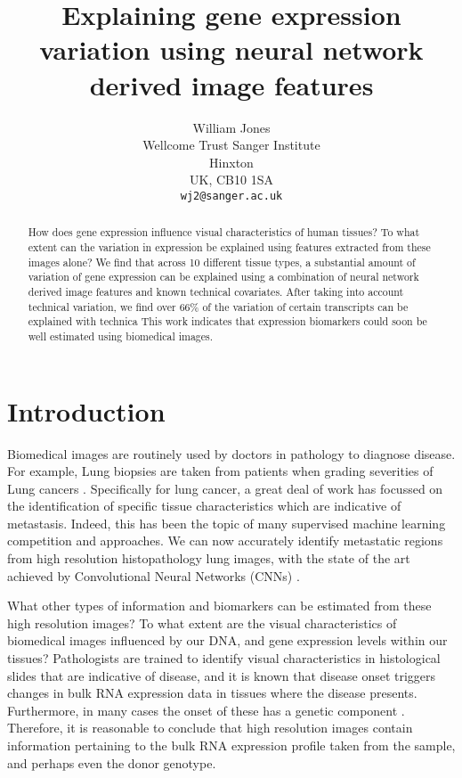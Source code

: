 \documentclass{article}
\title{Explaining gene expression variation using neural network derived image features}
\author{
  William Jones\\
  Wellcome Trust Sanger Institute\\
  Hinxton\\
  UK, CB10 1SA \\
  \texttt{wj2@sanger.ac.uk} \\
}
\begin{document}

\maketitle

\begin{abstract}
How does gene expression influence visual characteristics of human tissues? To what extent can the variation in expression be explained using features extracted from these images alone? We find that across 10 different tissue types, a substantial amount of variation of gene expression can be explained using a combination of neural network derived image features and known technical covariates. After taking into account technical variation, we find over 66\% of the variation of certain transcripts can be explained with technica This work indicates that expression biomarkers could soon be well estimated using biomedical images. \end{abstract}

\section{Introduction}
Biomedical images are routinely used by doctors in pathology to diagnose disease. For example, Lung biopsies are taken from patients when grading severities of Lung cancers \cite{histology-classification-lung-cancer}. Specifically for lung cancer, a great deal of work has focussed on the identification of specific tissue characteristics which are indicative of metastasis. Indeed, this has been the topic of many supervised machine learning competition and approaches. We can now accurately identify metastatic regions from high resolution histopathology lung images, with the state of the art achieved by Convolutional Neural Networks (CNNs) \cite{detecting-cancer-metastases}.

What other types of information and biomarkers can be estimated from these high resolution images? To what extent are the visual characteristics of biomedical images influenced by our DNA, and gene expression levels within our tissues? Pathologists are trained to identify visual characteristics in histological slides that are indicative of disease, and it is known that disease onset triggers changes in bulk RNA expression data in tissues where the disease presents. \cite{gene-expression-parkinsons} Furthermore, in many cases the onset of these has a genetic component \cite{what-is-complex-about-complex-disorders}. Therefore, it is reasonable to conclude that high resolution images contain information pertaining to the bulk RNA expression profile taken from the sample, and perhaps even the donor genotype.
\end{document}
